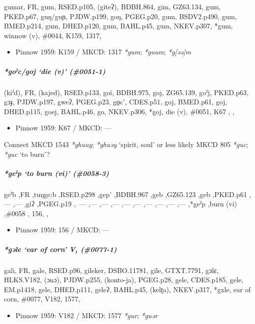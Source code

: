 \documentclass[a4paper,]{article}
\providecommand{\tightlist}{%
  \setlength{\itemsep}{0pt}\setlength{\parskip}{0pt}}
\let\oldsubparagraph\subparagraph
\renewcommand{\subparagraph}[1]{\oldsubparagraph{#1}\mbox{}}
\begin{document}
gumar, FR, gum, RSED.p105, (giteʔ), BDBH.864, gim, GZ63.134, gum,
PKED.p67, guŋ/guɲ, PJDW.p199, goŋ, PGEG.p20, gum, BSDV2.p490, gum,
BMED.p214, gum, DHED.p120, gum, BAHL.p45, gum, NKEV.p307, *gum, winnow
(v), \#0044, K159, 1317,

\begin{itemize}
\tightlist
\item
  Pinnow 1959: K159 / MKCD: 1317 \emph{*gum}; \emph{*guum};
  \emph{*g{[}əə{]}m}
\end{itemize}

\subparagraph{\texorpdfstring{\emph{*goˀc/goj} `die (v)'
(\#0051-1)}{*goˀc/goj die (v) (\#0051-1)}}\label{goux2c0cgoj-die-v-0051-1}

(kiˀd), FR, (kajed), RSED.p133, goĭ, BDBH.975, goj, ZG65.139, goˀj,
PKED.p63, gɔɟ, PJDW.p197, gweʔ, PGEG.p23, go̠c', CDES.p51, goj, BMED.p61,
goj, DHED.p115, goej, BAHL.p46, go, NKEV.p306, *goj, die (v), \#0051,
K67 , ,

\begin{itemize}
\tightlist
\item
  Pinnow 1959: K67 / MKCD: ---
\end{itemize}

Connect MKCD 1543 \emph{*ghuuy}; \emph{*ghuəy} `spirit, soul' or less
likely MKCD 805 \emph{*guc}; \emph{*guc} `to burn'?

\subparagraph{\texorpdfstring{\emph{*geˀp} `to burn (vi)'
(\#0058-3)}{*geˀp to burn (vi) (\#0058-3)}}\label{geux2c0p-to-burn-vi-0058-3-1}

geˀb ,FR ,tuŋge:b ,RSED.p298 ,gep' ,BDBH.967 ,geb ,GZ65.123 ,geb
,PKED.p61 ,--- ,--- ,giʔ ,PGEG.p19 ,~--- ,--- ,--- ,--- ,--- ,--- ,---
,--- ,--- ,--- ,*geˀp ,burn (vi) ,\#0058 , 156, ,

\begin{itemize}
\tightlist
\item
  Pinnow 1959: 156 / MKCD: ---
\end{itemize}

\subparagraph{\texorpdfstring{\emph{*gəle} `ear of corn' V₁
(\#0077-1)}{*gəle ear of corn V₁ (\#0077-1)}}\label{gux259le-ear-of-corn-v-0077-1}

gali, FR, gale, RSED.p96, gileker, DSBO.11781, gile, GTXT.7791, gɔlɛ,
HLKS.V182, (ɔnɔ), PJDW.p255, (konto-ja), PGEG.p28, gele, CDES.p185,
gele, EM.p1418, gele, DHED.p111, geleʔ, BAHL.p45, (kelʈa), NKEV.p317,
*gxle, ear of corn, \#0077, V182, 1577,

\begin{itemize}
\tightlist
\item
  Pinnow 1959: V182 / MKCD: 1577 \emph{*gur}; \emph{*guər}
\end{itemize}
\end{document}
